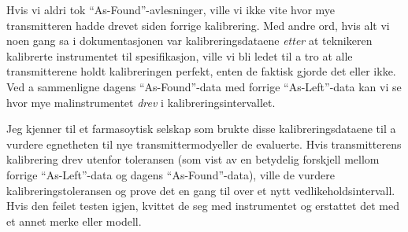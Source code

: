 Hvis vi aldri tok ``As-Found''-avlesninger, ville vi ikke vite hvor mye transmitteren hadde drevet siden forrige kalibrering.  Med andre ord, hvis alt vi noen gang sa i dokumentasjonen var kalibreringsdataene {\it etter} at teknikeren kalibrerte instrumentet til spesifikasjon, ville vi bli ledet til a tro at alle transmitterene holdt kalibreringen perfekt, enten de faktisk gjorde det eller ikke.  Ved a sammenligne dagens ``As-Found''-data med forrige ``As-Left''-data kan vi se hvor mye malinstrumentet {\it drev} i kalibreringsintervallet.

Jeg kjenner til et farmasoytisk selskap som brukte disse kalibreringsdataene til a vurdere egnetheten til nye transmittermodyeller de evaluerte.  Hvis transmitterens kalibrering drev utenfor toleransen (som vist av en betydelig forskjell mellom forrige ``As-Left''-data og dagens ``As-Found''-data), ville de vurdere kalibreringstoleransen og prove det en gang til over et nytt vedlikeholdsintervall.  Hvis den feilet testen igjen, kvittet de seg med instrumentet og erstattet det med et annet merke eller modell.




